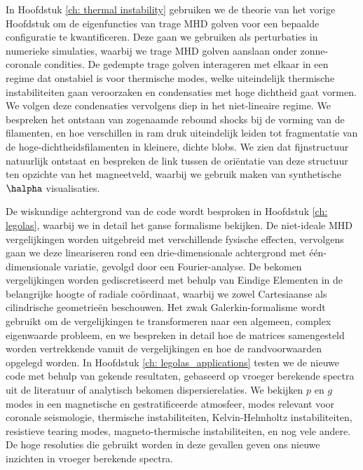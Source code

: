 In Hoofdstuk \ref{ch: thermal instability} gebruiken we de theorie van het vorige Hoofdstuk om de eigenfuncties van trage MHD golven voor een bepaalde configuratie te kwantificeren. Deze gaan we gebruiken als perturbaties in numerieke simulaties, waarbij we trage MHD golven aanslaan onder zonne-coronale condities. De gedempte trage golven interageren met elkaar in een regime dat onstabiel is voor thermische modes, welke uiteindelijk thermische instabiliteiten gaan veroorzaken en condensaties met hoge dichtheid gaat vormen. We volgen deze condensaties vervolgens diep in het niet-lineaire regime. We bespreken het ontstaan van zogenaamde rebound shocks bij de vorming van de filamenten, en hoe verschillen in ram druk uiteindelijk leiden tot fragmentatie van de hoge-dichtheidsfilamenten in kleinere, dichte blobs. We zien dat fijnstructuur natuurlijk ontstaat en bespreken de link tussen de oriëntatie van deze structuur ten opzichte van het magneetveld, waarbij we gebruik maken van synthetische $\halpha$ visualisaties.

De wiskundige achtergrond van de {\legolas} code wordt besproken in Hoofdstuk \ref{ch: legolas}, waarbij we in detail het ganse formalisme bekijken. De niet-ideale MHD vergelijkingen worden uitgebreid met verschillende fysische effecten, vervolgens gaan we deze lineariseren rond een drie-dimensionale achtergrond met één-dimensionale variatie, gevolgd door een Fourier-analyse. De bekomen vergelijkingen worden gediscretiseerd met behulp van Eindige Elementen in de belangrijke hoogte of radiale coördinaat, waarbij we zowel Cartesiaanse als cilindrische geometrieën beschouwen. Het zwak Galerkin-formalisme wordt gebruikt om de vergelijkingen te transformeren naar een algemeen, complex eigenwaarde probleem, en we bespreken in detail hoe de matrices samengesteld worden vertrekkende vanuit de vergelijkingen en hoe de randvoorwaarden opgelegd worden. In Hoofdstuk \ref{ch: legolas_applications} testen we de nieuwe code met behulp van gekende resultaten, gebaseerd op vroeger berekende spectra uit de literatuur of analytisch bekomen dispersierelaties. We bekijken $p$ en $g$ modes in een magnetische en gestratificeerde atmosfeer, modes relevant voor coronale seismologie, thermische instabiliteiten, Kelvin-Helmholtz instabiliteiten, resistieve tearing modes, magneto-thermische instabiliteiten, en nog vele andere. De hoge resoluties die gebruikt worden in deze gevallen geven ons nieuwe inzichten in vroeger berekende spectra.

